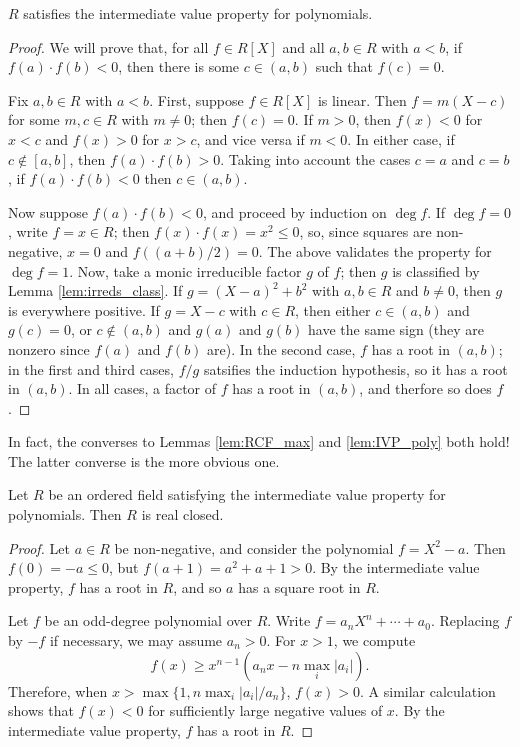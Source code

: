 \begin{lemma}
  \label{lem:IVP_poly}
  $R$ satisfies the intermediate value property for polynomials.
\end{lemma}
\begin{proof}
  We will prove that, for all $f\in R[X]$ and all $a,b\in R$ with $a<b$, if $f(a)\cdot f(b)<0$, then there is some $c\in(a,b)$ such that $f(c)=0$.

  Fix $a,b\in R$ with $a<b$. First, suppose $f\in R[X]$ is linear. Then $f=m(X-c)$ for some $m,c\in R$ with $m\neq0$; then $f(c)=0$. If $m>0$, then $f(x)<0$ for $x<c$ and $f(x)>0$ for $x>c$, and vice versa if $m<0$. In either case, if $c\notin[a,b]$, then $f(a)\cdot f(b)>0$. Taking into account the cases $c=a$ and $c=b$, if $f(a)\cdot f(b)<0$ then $c\in(a,b)$.

  Now suppose $f(a)\cdot f(b)<0$, and proceed by induction on $\deg f$. If $\deg f=0$, write $f=x\in R$; then $f(x)\cdot f(x)=x^2\leq 0$, so, since squares are non-negative, $x=0$ and $f((a+b)/2)=0$. The above validates the property for $\deg f=1$. Now, take a monic irreducible factor $g$ of $f$; then $g$ is classified by Lemma \ref{lem:irreds_class}. If $g=(X-a)^2+b^2$ with $a,b\in R$ and $b\neq0$, then $g$ is everywhere positive. If $g=X-c$ with $c\in R$, then either $c\in(a,b)$ and $g(c)=0$, or $c\notin(a,b)$ and $g(a)$ and $g(b)$ have the same sign (they are nonzero since $f(a)$ and $f(b)$ are). In the second case, $f$ has a root in $(a,b)$; in the first and third cases, $f/g$ satsifies the induction hypothesis, so it has a root in $(a,b)$. In all cases, a factor of $f$ has a root in $(a,b)$, and therfore so does $f$.
\end{proof}

In fact, the converses to Lemmas \ref{lem:RCF_max} and \ref{lem:IVP_poly} both hold! The latter converse is the more obvious one.

\begin{theorem}
  Let $R$ be an ordered field satisfying the intermediate value property for polynomials. Then $R$ is real closed.
\end{theorem}
\begin{proof}
  Let $a\in R$ be non-negative, and consider the polynomial $f=X^2-a$. Then $f(0)=-a\leq0$, but $f(a+1)=a^2+a+1>0$. By the intermediate value property, $f$ has a root in $R$, and so $a$ has a square root in $R$.

  Let $f$ be an odd-degree polynomial over $R$. Write $f=a_nX^n+\cdots+a_0$. Replacing $f$ by $-f$ if necessary, we may assume $a_n>0$. For $x>1$, we compute
  \[f(x)\geq x^{n-1}(a_nx-n\max_i|a_i|).\]
  Therefore, when $x>\max\{1,n\max_i|a_i|/a_n\}$, $f(x)>0$. A similar calculation shows that $f(x)<0$ for sufficiently large negative values of $x$. By the intermediate value property, $f$ has a root in $R$.
\end{proof}

